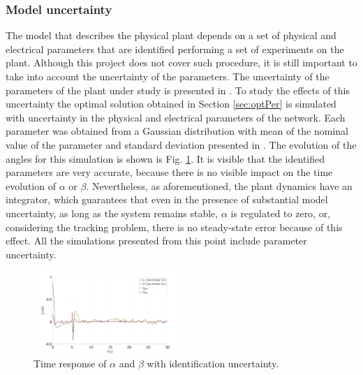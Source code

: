 \documentclass[letterpaper, 10 pt, conference]{ieeeconf}
\begin{document}
\subsubsection{Model uncertainty} The model that describes the physical plant depends on a set of physical and electrical parameters that are identified performing a set of experiments on the plant. Although this project does not cover such procedure, it is still important to take into account the uncertainty of the parameters. The uncertainty of the parameters of the plant under study is presented in \cite{balula2016nonlinear}. To study the effects of this uncertainty the optimal solution obtained in Section \ref{sec:optPer} is simulated with uncertainty in the physical and electrical parameters of the network. Each parameter was obtained from a Gaussian distribution with mean of the nominal value of the parameter and standard deviation presented in \cite{balula2016nonlinear}. The evolution of the angles for this simulation is shown is Fig. \ref{fig:10_0_angles}. It is visible that the identified parameters are very accurate, because there is no visible impact on the time evolution of $\alpha$ or $\beta$. Nevertheless, as aforementioned, the plant dynamics have an integrator, which guarantees that even in the presence of substantial model uncertainty, as long as the system remains stable, $\alpha$ is regulated to zero, or, considering the tracking problem, there is no steady-state error because of this effect. All the simulations presented from this point include parameter uncertainty.

\begin{figure}[h]
    \centering
    \includegraphics[width = 0.5\textwidth]{figures/10_0_angles.png}
    \caption{Time response of $\alpha$ and $\beta$ with identification uncertainty.}
    \label{fig:10_0_angles}
\end{figure}
\end{document}

